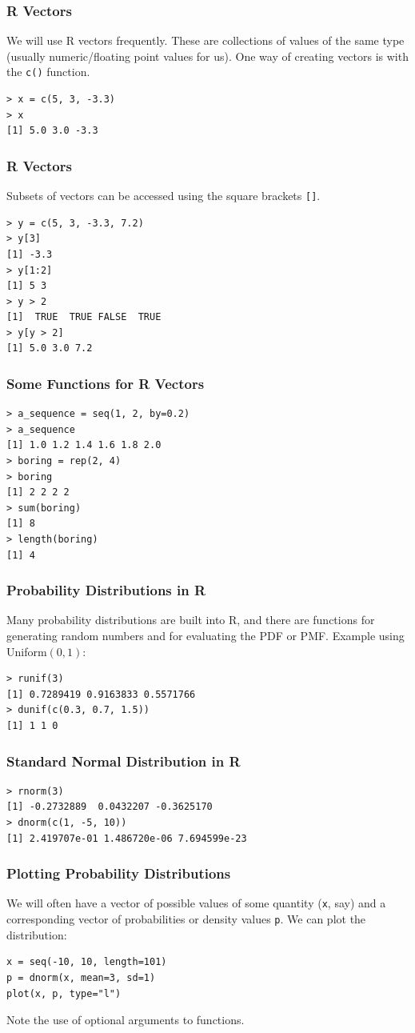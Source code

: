 \documentclass{beamer}
\begin{document}
\begin{frame}[fragile]
\frametitle{R Vectors}
We will use R vectors frequently. These are collections of values of the
same type (usually numeric/floating point values for us).
One way of creating vectors is with the \texttt{c()} function.
\begin{verbatim}
> x = c(5, 3, -3.3)
> x
[1] 5.0 3.0 -3.3
\end{verbatim}
\end{frame}

\begin{frame}[fragile]
\frametitle{R Vectors}
Subsets of vectors can be accessed using the square brackets
\texttt{[]}.
\begin{verbatim}
> y = c(5, 3, -3.3, 7.2)
> y[3]
[1] -3.3
> y[1:2]
[1] 5 3
> y > 2
[1]  TRUE  TRUE FALSE  TRUE
> y[y > 2]
[1] 5.0 3.0 7.2
\end{verbatim}
\end{frame}

\begin{frame}[fragile]
\frametitle{Some Functions for R Vectors}
\begin{verbatim}
> a_sequence = seq(1, 2, by=0.2)
> a_sequence
[1] 1.0 1.2 1.4 1.6 1.8 2.0
> boring = rep(2, 4)
> boring
[1] 2 2 2 2
> sum(boring)
[1] 8
> length(boring)
[1] 4
\end{verbatim}
\end{frame}


\begin{frame}[fragile]
\frametitle{Probability Distributions in R}
Many probability distributions are built into R, and there
are functions for generating random numbers and for evaluating
the PDF or PMF. Example using Uniform$(0, 1)$:
\begin{verbatim}
> runif(3)
[1] 0.7289419 0.9163833 0.5571766
> dunif(c(0.3, 0.7, 1.5))
[1] 1 1 0
\end{verbatim}
\end{frame}


\begin{frame}[fragile]
\frametitle{Standard Normal Distribution in R}
\begin{verbatim}
> rnorm(3)
[1] -0.2732889  0.0432207 -0.3625170
> dnorm(c(1, -5, 10))
[1] 2.419707e-01 1.486720e-06 7.694599e-23
\end{verbatim}
\end{frame}


\begin{frame}[fragile]
\frametitle{Plotting Probability Distributions}
We will often have a vector of possible values of some
quantity (\texttt{x}, say) and a corresponding vector of
probabilities or density values
\texttt{p}. We can plot the distribution:
\begin{verbatim}
x = seq(-10, 10, length=101)
p = dnorm(x, mean=3, sd=1)
plot(x, p, type="l")
\end{verbatim}
Note the use of optional arguments to functions.
\end{frame}
\end{document}
